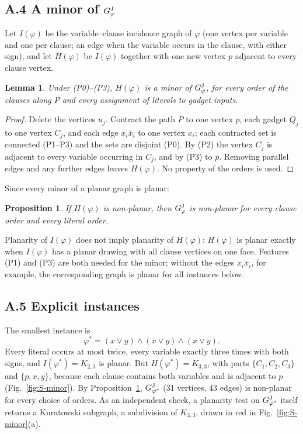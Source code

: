 \documentclass[aps,pre,onecolumn,nofootinbib]{revtex4-2}
\newtheorem{lemma}[theorem]{Lemma}
\newtheorem{proposition}[theorem]{Proposition}
\theoremstyle{remark}
\begin{document}
\subsection*{A.4 A minor of \texorpdfstring{$G^{\rm J}_\varphi$}{the reduction graph}}

Let $I(\varphi)$ be the variable--clause incidence graph of $\varphi$ (one vertex per variable and
one per clause; an edge when the variable occurs in the clause, with either sign), and let
$H(\varphi)$ be $I(\varphi)$ together with one new vertex $p$ adjacent to every clause vertex.

\begin{lemma}\label{lem:S-minor}
Under (P0)--(P3), $H(\varphi)$ is a minor of $G^{\rm J}_\varphi$, for every order of the clauses along $P$
and every assignment of literals to gadget inputs.
\end{lemma}

\begin{proof}
Delete the vertices $u_j$. Contract the path $P$ to one vertex $p$, each gadget $Q_j$ to one vertex
$C_j$, and each edge $x_i\bar x_i$ to one vertex $x_i$; each contracted set is connected (P1--P3)
and the sets are disjoint (P0). By (P2) the vertex $C_j$ is adjacent to every variable occurring in
$C_j$, and by (P3) to $p$. Removing parallel edges and any further edges leaves $H(\varphi)$. No
property of the orders is used.
\end{proof}

Since every minor of a planar graph is planar:

\begin{proposition}\label{prop:S-criterion}
If $H(\varphi)$ is non-planar, then $G^{\rm J}_\varphi$ is non-planar for every clause order and every
literal order.
\end{proposition}

Planarity of $I(\varphi)$ does not imply planarity of $H(\varphi)$: $H(\varphi)$ is planar exactly
when $I(\varphi)$ has a planar drawing with all clause vertices on one face. Features (P1) and (P3)
are both needed for the minor; without the edges $x_i\bar x_i$, for example, the corresponding
graph is planar for all instances below.

\subsection*{A.5 Explicit instances}

The smallest instance is
\begin{equation}
\varphi^* = (x\vee y)\wedge(\bar x\vee y)\wedge(x\vee\bar y).
\end{equation}
Every literal occurs at most twice, every variable exactly three times with both signs, and
$I(\varphi^*)=K_{2,3}$ is planar. But $H(\varphi^*)=K_{3,3}$, with parts $\{C_1,C_2,C_3\}$ and
$\{p,x,y\}$, because each clause contains both variables and is adjacent to $p$
(Fig.~\ref{fig:S-minor}). By Proposition~\ref{prop:S-criterion}, $G^{\rm J}_{\varphi^*}$ (31 vertices, 43
edges) is non-planar for every choice of orders. As an independent check, a planarity test on
$G^{\rm J}_{\varphi^*}$ itself returns a Kuratowski subgraph, a subdivision of $K_{3,3}$, drawn in red in
Fig.~\ref{fig:S-minor}(a).
\end{document}
